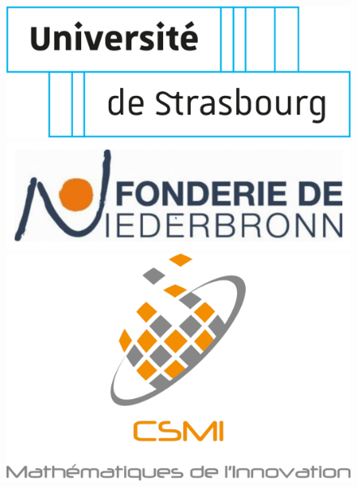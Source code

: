 \documentclass[12pt]{article}
\begin{document}
\begin{titlepage}
\title{}
\author{Congo Job
\\ Stage Master 2 \\
 IRMA, Université de Strasbourg, France}
\date{ }

\begin{figure}[b!]
\centering
\vfill
\includegraphics[scale=0.16]{Images/logo-unistra.pdf}
\hspace{0.5 cm}
\includegraphics[scale=0.16]{Images/logo-Fonderie.pdf}
\hspace{0.5 cm}
\includegraphics[scale=0.16]{Images/logoCSMI.pdf}
\end{figure}
\end{titlepage}


\maketitle
\thispagestyle{empty}
\end{document}
